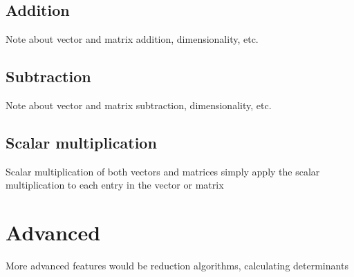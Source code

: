 \documentclass[a4]{article}
\begin{document}
\subsection{Addition}
Note about vector and matrix addition, dimensionality, etc.

\subsection{Subtraction}
Note about vector and matrix subtraction, dimensionality, etc.

\subsection{Scalar multiplication}
Scalar multiplication of both vectors and matrices simply apply the scalar multiplication to each entry in the vector or matrix


\section{Advanced}
More advanced features would be reduction algorithms, calculating determinants
\end{document}
